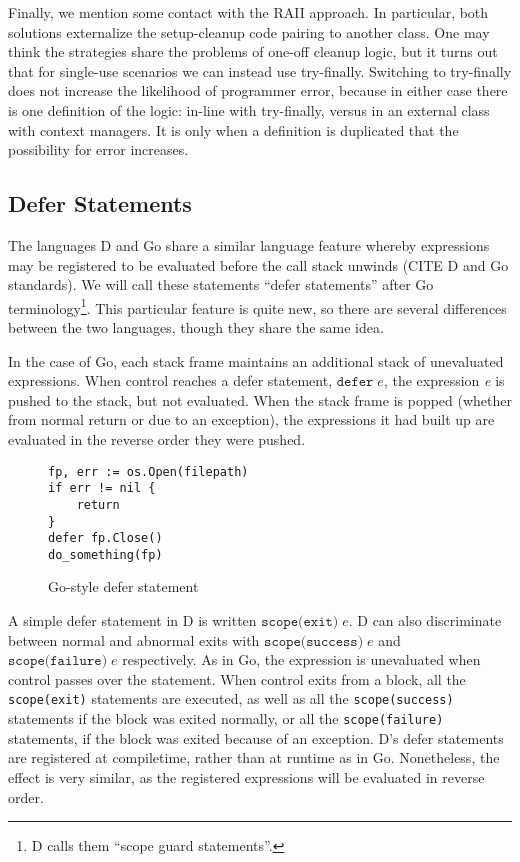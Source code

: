\documentclass[11pt]{article}
\newcommand{\maybePage}{\newpage}
\begin{document}
Finally, we mention some contact with the RAII approach.
In particular, both solutions externalize the setup-cleanup code pairing to another class.
One may think the strategies share the problems of one-off cleanup logic, but it turns out that for single-use scenarios we can instead use try-finally.
Switching to try-finally does not increase the likelihood of programmer error, because in either case there is one definition of the logic: in-line with try-finally, versus in an external class with context managers.
It is only when a definition is duplicated that the possibility for error increases.


\maybePage
\subsection{Defer Statements}
\label{defer}

The languages D and Go share a similar language feature whereby expressions may be registered to be evaluated before the call stack unwinds (CITE D and Go standards). We will call these statements ``defer statements'' after Go terminology\footnote{D calls them ``scope guard statements''.}. This particular feature is quite new, so there are several differences between the two languages, though they share the same idea.

In the case of Go, each stack frame maintains an additional stack of unevaluated expressions. When control reaches a defer statement, $\texttt{defer}\;e$, the expression \textit{e} is pushed to the stack, but not evaluated. When the stack frame is popped (whether from normal return or due to an exception), the expressions it had built up are evaluated in the reverse order they were pushed.

\begin{figure}[H]
\caption{Go-style defer statement}
\label{goDeferStatement}
\begin{verbatim}
fp, err := os.Open(filepath)
if err != nil {
    return
}
defer fp.Close()
do_something(fp)
\end{verbatim}
\end{figure}

A simple defer statement in D is written $\texttt{scope(exit)}\;e$.
D can also discriminate between normal and abnormal exits with $\texttt{scope(success)}\;e$ and $\texttt{scope(failure)}\;e$ respectively.
As in Go, the expression is unevaluated when control passes over the statement.
When control exits from a block, all the \texttt{scope(exit)} statements are executed, as well as all the \texttt{scope(success)} statements if the block was exited normally, or all the \texttt{scope(failure)} statements, if the block was exited because of an exception.
D's defer statements are registered at compiletime, rather than at runtime as in Go.
Nonetheless, the effect is very similar, as the registered expressions will be evaluated in reverse order.
\end{document}
